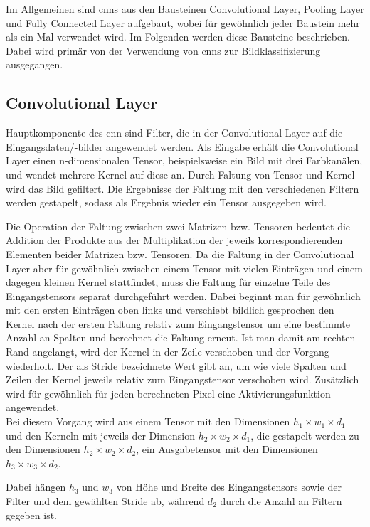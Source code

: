 Im Allgemeinen sind \ac{cnn}s aus den Bausteinen Convolutional Layer, Pooling Layer und Fully Connected Layer aufgebaut, wobei für 
gewöhnlich jeder Baustein mehr als ein Mal verwendet wird. Im Folgenden werden diese Bausteine beschrieben. Dabei wird primär 
von der Verwendung von \ac{cnn}s zur Bildklassifizierung ausgegangen.

\subsection{Convolutional Layer}
Hauptkomponente des \ac{cnn} sind Filter, die in der Convolutional Layer auf die Eingangsdaten/-bilder angewendet werden. 
Als Eingabe erhält die Convolutional Layer einen n-dimensionalen Tensor, beispielsweise ein Bild mit drei Farbkanälen, und 
wendet mehrere Kernel auf diese an. Durch Faltung von Tensor und Kernel wird das Bild gefiltert. Die Ergebnisse der Faltung 
mit den verschiedenen Filtern werden gestapelt, sodass als Ergebnis wieder ein Tensor ausgegeben wird. \cite{Michelucci:2019}

Die Operation der Faltung zwischen zwei Matrizen bzw. Tensoren bedeutet die Addition der Produkte aus der Multiplikation der jeweils 
korrespondierenden Elementen beider Matrizen bzw. Tensoren. Da die Faltung in der Convolutional Layer aber für gewöhnlich zwischen 
einem Tensor mit vielen Einträgen und einem dagegen kleinen Kernel stattfindet, muss die Faltung für einzelne Teile des Eingangstensors 
separat durchgeführt werden. Dabei beginnt man für gewöhnlich mit den ersten Einträgen oben links und verschiebt bildlich gesprochen 
den Kernel nach der ersten Faltung relativ zum Eingangstensor um eine bestimmte Anzahl an Spalten und berechnet die Faltung erneut. 
Ist man damit am rechten Rand angelangt, wird der Kernel in der Zeile verschoben und der Vorgang wiederholt. Der als Stride bezeichnete 
Wert gibt an, um wie viele Spalten und Zeilen der Kernel jeweils relativ zum Eingangstensor verschoben wird. Zusätzlich wird für gewöhnlich 
für jeden berechneten Pixel eine Aktivierungsfunktion angewendet. \cite{Michelucci:2019}\\

Bei diesem Vorgang wird aus einem Tensor mit den Dimensionen $h_1 \times w_1 \times d_1$ und den Kerneln mit jeweils 
der Dimension $h_2 \times w_2 \times d_1$, die gestapelt werden zu den Dimensionen $h_2 \times w_2 \times d_2$, 
ein Ausgabetensor mit den Dimensionen $h_3 \times w_3 \times d_2$. \cite{Arunava:2018}

Dabei hängen $h_3$ und $w_3$ von Höhe und Breite des Eingangstensors sowie der Filter und dem gewählten Stride ab, 
während $d_2$ durch die Anzahl an Filtern gegeben ist.

